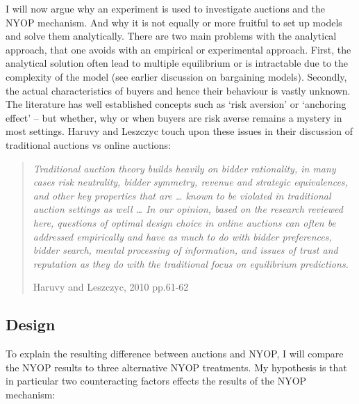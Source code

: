 \documentclass[a4paper,12pt]{article}
\begin{document}
	I will now argue why an experiment is used to investigate auctions and the NYOP mechanism. And why it is not equally or more fruitful to set up models and solve them analytically. There are two main problems with the analytical approach, that one avoids with an empirical or experimental approach. First, the analytical solution often lead to multiple equilibrium or is intractable due to the complexity of the model (see earlier discussion on bargaining models). Secondly, the actual characteristics of buyers and hence their behaviour is vastly unknown. The literature has well established concepts such as `risk aversion' or `anchoring effect' -- but whether, why or when buyers are risk averse remains a mystery in most settings. Haruvy and Leszczyc touch upon these issues in their discussion of traditional auctions vs online auctions:
	\blockquote[Haruvy and Leszczyc, 2010 pp.61-62]{\emph{Traditional auction theory builds heavily on bidder rationality, in many cases risk neutrality, bidder symmetry, revenue and strategic equivalences, and other key properties that are … known to be violated in traditional auction settings as well … In our opinion, based on the research reviewed here, questions of optimal design choice in online auctions can often be addressed empirically and have as much to do with bidder preferences, bidder search, mental processing of information, and issues of trust and reputation as they do with the traditional focus on equilibrium predictions. }}


	\subsection{Design}

	To explain the resulting difference between auctions and NYOP, I will compare the NYOP results to three alternative NYOP treatments. My hypothesis is that in particular two counteracting factors effects the results of the NYOP mechanism:
\end{document}
